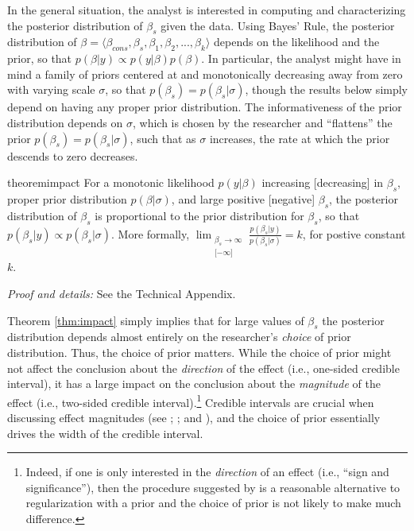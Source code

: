 \documentclass[12pt]{article}
\begin{document}
In the general situation, the analyst is interested in computing and characterizing the posterior distribution of $\beta_s$ given the data. 
Using Bayes' Rule, the posterior distribution of $\beta = \langle \beta_{cons}, \beta_{s}, \beta_1, \beta_2, ..., \beta_k \rangle$ depends on the likelihood and the prior, so that $p(\beta | y) \propto p(y|\beta)p(\beta)$. 
In particular, the analyst might have in mind a family of priors centered at and monotonically decreasing away from zero with varying scale $\sigma$, so that $p(\beta_s) = p(\beta_s | \sigma)$, though the results below simply depend on having any proper prior distribution. 
The informativeness of the prior distribution depends on $\sigma$, which is chosen by the researcher and ``flattens'' the prior $p(\beta_s) = p(\beta_s | \sigma)$, such that as $\sigma$ increases, the rate at which the prior descends to zero decreases.

\begin{restatable}{theorem}{impact}\label{thm:impact}
For a monotonic likelihood $p(y | \beta)$ increasing [decreasing] in $\beta_s$, proper prior distribution $p(\beta | \sigma)$, and large positive [negative] $\beta_s$, the posterior distribution of $\beta_s$ is proportional to the prior distribution for $\beta_s$, so that $p(\beta_s | y) \propto p(\beta_s | \sigma)$. 
More formally, $\displaystyle \lim _{\substack{\beta_s \to \infty\\ \lbrack -\infty \rbrack}} \frac{p(\beta_s | y)}{p(\beta_s | \sigma)} = k$, for postive constant $k$.
\end{restatable}

\noindent \textit{Proof and details:} See the Technical Appendix.

Theorem \ref{thm:impact} simply implies that for large values of $\beta_s$ the posterior distribution depends almost entirely on the researcher's \emph{choice} of prior distribution. 
Thus, the choice of prior matters. 
While the choice of prior might not affect the conclusion about the \emph{direction} of the effect (i.e., one-sided credible interval), it has a large impact on the conclusion about the \emph{magnitude} of the effect (i.e., two-sided credible interval).\footnote{
Indeed, if one is only interested in the \textit{direction} of an effect (i.e., ``sign and significance''), then the procedure suggested by \cite{Geyer2009} is a reasonable alternative to regularization with a prior and the choice of prior is not likely to make much difference.} 
Credible intervals are crucial when discussing effect magnitudes (see \citealt{KingTomzWittenberg2000}; \citealt{Rainey2014a}; and \citealt{Gross2014}), and the choice of prior essentially drives the width of the credible interval.
\end{document}
